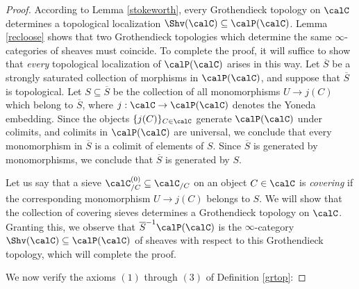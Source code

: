 \begin{proof}
According to Lemma \ref{stokeworth}, every Grothendieck topology on $\calC$ determines
a topological localization $\Shv(\calC) \subseteq \calP(\calC)$. Lemma \ref{recloose} shows that two Grothendieck topologies which determine the same $\infty$-categories of sheaves must coincide. To complete the proof, it will suffice to show that {\em every} topological localization of
$\calP(\calC)$ arises in this way. Let $\overline{S}$ be a strongly saturated collection of morphisms in $\calP(\calC)$, and suppose that $\overline{S}$ is topological. Let $S \subseteq \overline{S}$
be the collection of all monomorphisms $U \rightarrow j(C)$ which belong to $\overline{S}$, where
$j: \calC \rightarrow \calP(\calC)$ denotes the Yoneda embedding. Since the objects $\{ j(C) \}_{C \in \calC}$ generate $\calP(\calC)$ under colimits, and colimits in $\calP(\calC)$ are universal, 
we conclude that every monomorphism in $\overline{S}$ is a colimit of elements of $S$. 
Since $\overline{S}$ is generated by monomorphisms, we conclude that $\overline{S}$ is generated by $S$. 

Let us say that a sieve $\calC^{(0)}_{/C} \subseteq \calC_{/C}$ on an object $C \in \calC$
is {\it covering} if the corresponding monomorphism $U \rightarrow j(C)$ belongs to $S$.
We will show that the collection of covering sieves determines a Grothendieck topology on $\calC$. Granting this, we observe that $\overline{S}^{-1} \calP(\calC)$ is the $\infty$-category $\Shv(\calC) \subseteq \calP(\calC)$ of sheaves with respect to this Grothendieck topology, which will complete the proof.

We now verify the axioms $(1)$ through $(3)$ of Definition \ref{grtop}:


\end{proof}

